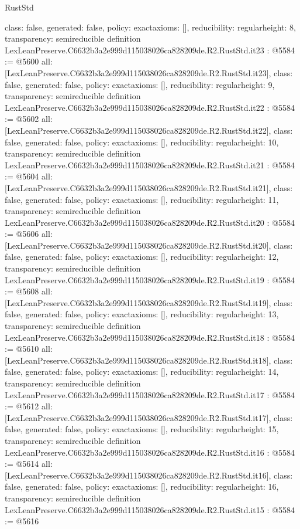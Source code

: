 \begin{lexlean}{RustStd}
\begin{coremodule}
{  class: false,
  generated: false,
  policy: exact{axioms: []},
  reducibility: regular{height: 8},
  transparency: semireducible
}
definition LexLeanPreserve.C6632b3a2e999d115038026ca828209de.R2.RustStd.it23 : @5584 := @5600 {
  all: [LexLeanPreserve.C6632b3a2e999d115038026ca828209de.R2.RustStd.it23],
  class: false,
  generated: false,
  policy: exact{axioms: []},
  reducibility: regular{height: 9},
  transparency: semireducible
}
definition LexLeanPreserve.C6632b3a2e999d115038026ca828209de.R2.RustStd.it22 : @5584 := @5602 {
  all: [LexLeanPreserve.C6632b3a2e999d115038026ca828209de.R2.RustStd.it22],
  class: false,
  generated: false,
  policy: exact{axioms: []},
  reducibility: regular{height: 10},
  transparency: semireducible
}
definition LexLeanPreserve.C6632b3a2e999d115038026ca828209de.R2.RustStd.it21 : @5584 := @5604 {
  all: [LexLeanPreserve.C6632b3a2e999d115038026ca828209de.R2.RustStd.it21],
  class: false,
  generated: false,
  policy: exact{axioms: []},
  reducibility: regular{height: 11},
  transparency: semireducible
}
definition LexLeanPreserve.C6632b3a2e999d115038026ca828209de.R2.RustStd.it20 : @5584 := @5606 {
  all: [LexLeanPreserve.C6632b3a2e999d115038026ca828209de.R2.RustStd.it20],
  class: false,
  generated: false,
  policy: exact{axioms: []},
  reducibility: regular{height: 12},
  transparency: semireducible
}
definition LexLeanPreserve.C6632b3a2e999d115038026ca828209de.R2.RustStd.it19 : @5584 := @5608 {
  all: [LexLeanPreserve.C6632b3a2e999d115038026ca828209de.R2.RustStd.it19],
  class: false,
  generated: false,
  policy: exact{axioms: []},
  reducibility: regular{height: 13},
  transparency: semireducible
}
definition LexLeanPreserve.C6632b3a2e999d115038026ca828209de.R2.RustStd.it18 : @5584 := @5610 {
  all: [LexLeanPreserve.C6632b3a2e999d115038026ca828209de.R2.RustStd.it18],
  class: false,
  generated: false,
  policy: exact{axioms: []},
  reducibility: regular{height: 14},
  transparency: semireducible
}
definition LexLeanPreserve.C6632b3a2e999d115038026ca828209de.R2.RustStd.it17 : @5584 := @5612 {
  all: [LexLeanPreserve.C6632b3a2e999d115038026ca828209de.R2.RustStd.it17],
  class: false,
  generated: false,
  policy: exact{axioms: []},
  reducibility: regular{height: 15},
  transparency: semireducible
}
definition LexLeanPreserve.C6632b3a2e999d115038026ca828209de.R2.RustStd.it16 : @5584 := @5614 {
  all: [LexLeanPreserve.C6632b3a2e999d115038026ca828209de.R2.RustStd.it16],
  class: false,
  generated: false,
  policy: exact{axioms: []},
  reducibility: regular{height: 16},
  transparency: semireducible
}
definition LexLeanPreserve.C6632b3a2e999d115038026ca828209de.R2.RustStd.it15 : @5584 := @5616 {
}
\end{coremodule}
\end{lexlean}
